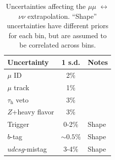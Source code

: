 \begin{table}[]
    \begin{center}
    \caption{Uncertainties affecting the $\mu\mu$ $\leftrightarrow$ $\nu\nu$ extrapolation. ``Shape'' uncertainties have different priors for each bin, but are assumed to be correlated across bins.}
    \label{tab:mt:zmm_uncs}
    \begin{tabular}{lcl}
        Uncertainty & 1 s.d. & Notes \\
        \hline \hline
        $\mu$ ID  & 2\% & \\
        $\mu$ track  & 1\% & \\
        $\tau_\mathrm{h}$ veto  & 3\% & \\
        $Z$+heavy flavor & 3\% & \\
        Trigger & 0-2\% & Shape \\
        $b$-tag & $\sim0.5\%$ & Shape \\
        $udcsg$-mistag & 3-4\% & Shape \\
    \end{tabular}
\end{center}
\end{table}


